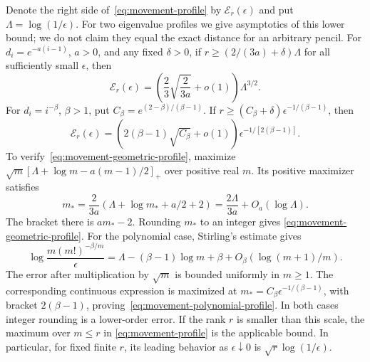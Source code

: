 Denote the right side of~\eqref{eq:movement-profile} by
$\mathcal E_r(\epsilon)$ and put $\Lambda=\log(1/\epsilon)$. For
two eigenvalue profiles we give asymptotics of this lower bound; we do not
claim they equal the exact distance for an arbitrary pencil.
For $d_i=e^{-a(i-1)}$, $a>0$, and any fixed $\delta>0$, if
$r\geq(2/(3a)+\delta)\Lambda$ for all sufficiently small
$\epsilon$, then
\begin{equation}\label{eq:movement-geometric-profile}
 \mathcal E_r(\epsilon)
 =\left(\frac23\sqrt{\frac{2}{3a}}+o(1)\right)\Lambda^{3/2}.
\end{equation}
For $d_i=i^{-\beta}$, $\beta>1$, put
$C_\beta=e^{(2-\beta)/(\beta-1)}$. If
$r\geq(C_\beta+\delta)\epsilon^{-1/(\beta-1)}$, then
\begin{equation}\label{eq:movement-polynomial-profile}
 \mathcal E_r(\epsilon)
 =\left(2(\beta-1)\sqrt{C_\beta}+o(1)\right)
       \epsilon^{-1/[2(\beta-1)]}.
\end{equation}
To verify~\eqref{eq:movement-geometric-profile}, maximize
$\sqrt m[\Lambda+\log m-a(m-1)/2]_+$ over positive real $m$.
Its positive maximizer satisfies
\[
 m_*=\frac{2}{3a}(\Lambda+\log m_*+a/2+2)
     =\frac{2\Lambda}{3a}+O_a(\log\Lambda).
\]
The bracket there is $am_*-2$. Rounding $m_*$ to an integer gives
\eqref{eq:movement-geometric-profile}. For the polynomial case,
Stirling's estimate gives
\[
 \log\frac{m(m!)^{-\beta/m}}{\epsilon}
 =\Lambda-(\beta-1)\log m+\beta+O_\beta(\log(m+1)/m).
\]
The error after multiplication by $\sqrt m$ is bounded uniformly in
$m\geq1$. The corresponding continuous expression is maximized at
$m_*=C_\beta\epsilon^{-1/(\beta-1)}$, with bracket
$2(\beta-1)$, proving~\eqref{eq:movement-polynomial-profile}.
In both cases integer rounding is a lower-order error. If the rank $r$ is
smaller than this scale, the maximum over $m\leq r$ in
\eqref{eq:movement-profile} is the applicable bound. In particular,
for fixed finite $r$, its leading behavior as $\epsilon\downarrow0$
is $\sqrt r\log(1/\epsilon)$.

